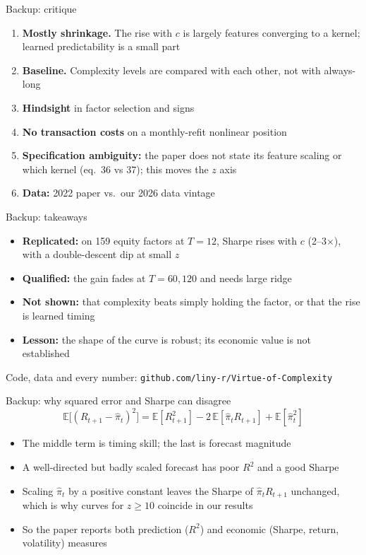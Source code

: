 \documentclass[aspectratio=169,10pt]{beamer}
\newcommand{\E}{\mathbb{E}}
\newcommand{\spk}{}
\begin{document}
\renewcommand{\spk}{Presenter: Hao Li}
\begin{frame}{Backup: critique}
\begin{enumerate}
  \item \textbf{Mostly shrinkage.} The rise with $c$ is largely features converging to a kernel; learned predictability is a small part
  \item \textbf{Baseline.} Complexity levels are compared with each other, not with always-long
  \item \textbf{Hindsight} in factor selection and signs
  \item \textbf{No transaction costs} on a monthly-refit nonlinear position
  \item \textbf{Specification ambiguity:} the paper does not state its feature scaling or which kernel (eq.\ 36 vs 37); this moves the $z$ axis
  \item \textbf{Data:} 2022 paper vs.\ our 2026 data vintage
\end{enumerate}
\end{frame}

\begin{frame}{Backup: takeaways}
\begin{itemize}
  \item \textbf{Replicated:} on 159 equity factors at $T=12$, Sharpe rises with $c$ (2--3$\times$), with a double-descent dip at small $z$
  \item \textbf{Qualified:} the gain fades at $T=60,120$ and needs large ridge
  \item \textbf{Not shown:} that complexity beats simply holding the factor, or that the rise is learned timing
  \item \textbf{Lesson:} the shape of the curve is robust; its economic value is not established
\end{itemize}
\vspace{8pt}
\centering\small Code, data and every number: \texttt{github.com/liny-r/Virtue-of-Complexity}
\end{frame}

\renewcommand{\spk}{Presenter: Hongjun Ding}
\begin{frame}{Backup: why squared error and Sharpe can disagree}
\[
\E\big[(R_{t+1}-\hat\pi_t)^2\big]=\E[R_{t+1}^2]-2\,\E[\hat\pi_t R_{t+1}]+\E[\hat\pi_t^2]
\]
\begin{itemize}
  \item The middle term is timing skill; the last is forecast magnitude
  \item A well-directed but badly scaled forecast has poor $R^2$ and a good Sharpe
  \item Scaling $\hat\pi_t$ by a positive constant leaves the Sharpe of $\hat\pi_tR_{t+1}$ unchanged, which is why curves for $z\ge10$ coincide in our results
  \item So the paper reports both prediction ($R^2$) and economic (Sharpe, return, volatility) measures
\end{itemize}
\end{frame}
\end{document}

